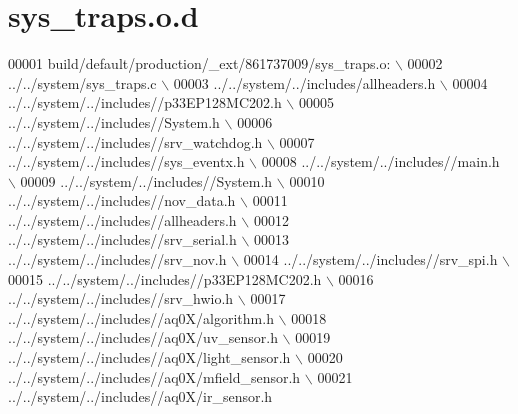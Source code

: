 \hypertarget{a00071_source}{\section{sys\+\_\+traps.\+o.\+d}
\label{a00071_source}
}

\begin{DoxyCode}
00001 build/\textcolor{keywordflow}{default}/production/\_ext/861737009/sys\_traps.o:  \(\backslash\)
00002  ../../system/sys\_traps.c  \(\backslash\)
00003 ../../system/../includes/allheaders.h  \(\backslash\)
00004 ../../system/../includes\textcolor{comment}{//p33EP128MC202.h  \(\backslash\)}
00005 \textcolor{comment}{../../system/../includes//System.h  \(\backslash\)}
00006 \textcolor{comment}{../../system/../includes//srv\_watchdog.h  \(\backslash\)}
00007 \textcolor{comment}{../../system/../includes//sys\_eventx.h  \(\backslash\)}
00008 \textcolor{comment}{../../system/../includes//main.h  \(\backslash\)}
00009 \textcolor{comment}{../../system/../includes//System.h  \(\backslash\)}
00010 \textcolor{comment}{../../system/../includes//nov\_data.h  \(\backslash\)}
00011 \textcolor{comment}{../../system/../includes//allheaders.h  \(\backslash\)}
00012 \textcolor{comment}{../../system/../includes//srv\_serial.h  \(\backslash\)}
00013 \textcolor{comment}{../../system/../includes//srv\_nov.h  \(\backslash\)}
00014 \textcolor{comment}{../../system/../includes//srv\_spi.h  \(\backslash\)}
00015 \textcolor{comment}{../../system/../includes//p33EP128MC202.h  \(\backslash\)}
00016 \textcolor{comment}{../../system/../includes//srv\_hwio.h  \(\backslash\)}
00017 \textcolor{comment}{../../system/../includes//aq0X/algorithm.h  \(\backslash\)}
00018 \textcolor{comment}{../../system/../includes//aq0X/uv\_sensor.h  \(\backslash\)}
00019 \textcolor{comment}{../../system/../includes//aq0X/light\_sensor.h  \(\backslash\)}
00020 \textcolor{comment}{../../system/../includes//aq0X/mfield\_sensor.h  \(\backslash\)}
00021 \textcolor{comment}{../../system/../includes//aq0X/ir\_sensor.h }
\end{DoxyCode}
